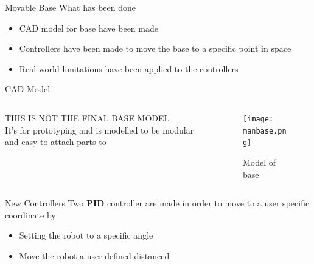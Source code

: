 \documentclass{beamer}
\begin{document}










\begin{frame}{Movable Base}
What has been done\\
\begin{itemize}
    \item CAD model for base have been made
    \item Controllers have been made to move the base to a specific point in space
    \item Real world limitations have been applied to the controllers
\end{itemize}
\end{frame}





\begin{frame}{CAD Model}
\begin{columns}
\begin{column}[]{0.5\textwidth}
THIS IS NOT THE FINAL BASE MODEL\\
It's for prototyping and is modelled to be modular and easy to attach parts to

\end{column}
\begin{column}[]{0.5\textwidth}
\begin{figure}
    \centering
    \texttt{[image: manbase.png]}
    \caption{Model of base}
    \label{fig:my_label}
\end{figure}
\end{column}
\end{columns}
\end{frame}




\begin{frame}{New Controllers}
Two \textbf{PID} controller are made in order to move to a user specific coordinate by
\begin{itemize}
    \item Setting the robot to a specific angle
    \item Move the robot a user defined distanced
\end{itemize}
\end{frame}
\end{document}
